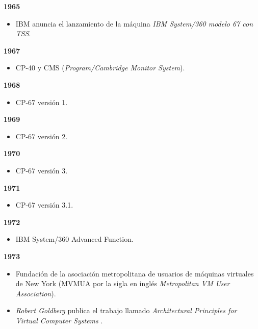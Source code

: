 \textbf{1965}\\
\begin{itemize}
	\item IBM anuncia el lanzamiento de la máquina \textit{IBM System/360 modelo 67 con TSS}.\\
\end{itemize}

\textbf{1967}\\
\begin{itemize}
	\item CP-40 y CMS (\textit{Program/Cambridge Monitor System}).\\
\end{itemize}

\textbf{1968}\\
\begin{itemize}
	\item CP-67 versión 1.\\
\end{itemize}

\textbf{1969}\\
\begin{itemize}
	\item CP-67 versión 2.\\
\end{itemize}

\textbf{1970}\\
\begin{itemize}
	\item CP-67 versión 3.\\
\end{itemize}

\textbf{1971}\\
\begin{itemize}
	\item CP-67 versión 3.1.\\
\end{itemize}

\textbf{1972}\\
\begin{itemize}
	\item IBM System/360 Advanced Function.\\
\end{itemize}

\textbf{1973}\\
\begin{itemize}
	\item Fundación de la asociación metropolitana de usuarios de máquinas virtuales de New York (MVMUA por la sigla en inglés \textit{Metropolitan VM User Association}).\\
	
	\item \textit{Robert Goldberg} publica el trabajo llamado \textit{Architectural Principles for Virtual Computer Systems} \parencite{Goldberg1973}.\\
	
\end{itemize}

